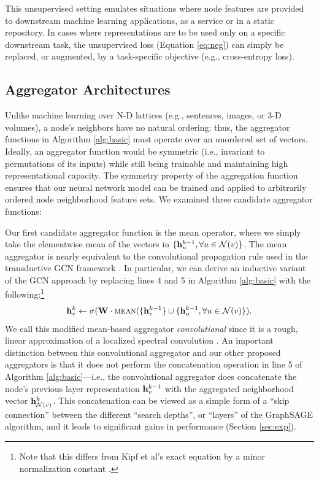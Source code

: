 This unsupervised setting emulates situations where node features are provided to downstream machine learning applications, as a service or in a static repository. 
In cases where representations are to be used only on a specific downstream task, the unsupervised loss (Equation \ref{eq:neg}) can simply be replaced, or augmented, by a task-specific objective (e.g., cross-entropy loss).

\subsection{Aggregator Architectures}\label{sec:aggs}

Unlike machine learning over N-D lattices (e.g., sentences, images, or 3-D volumes), a node's neighbors have no natural ordering; thus, the aggregator functions in Algorithm \ref{alg:basic} must operate over an unordered set of vectors.
Ideally, an aggregator function would be symmetric (i.e., invariant to permutations of its inputs) while still being trainable and maintaining high representational capacity. 
The symmetry property of the aggregation function ensures that our neural network model can be trained and applied to arbitrarily ordered node neighborhood feature sets.
We examined three candidate aggregator functions:

 Our first candidate aggregator function is the mean operator, where we simply take the elementwise mean of the vectors in $\{\mathbf{h}_u^{k-1}, \forall u \in \mathcal{N}(v)\}$.
The mean aggregator is nearly equivalent to the convolutional propagation rule used in the transductive GCN framework \cite{kipf2016semi}.
In particular, we can derive an inductive variant of the GCN approach by replacing lines 4 and 5 in Algorithm \ref{alg:basic} with the following:\footnote{Note that this differs from Kipf et al's exact equation by a minor normalization constant \cite{kipf2016semi}.}
\begin{equation}
\mathbf{h}^k_v \leftarrow \sigma(\mathbf{W}\cdot\textsc{mean}(\{\mathbf{h}^{k-1}_v\} \cup \{\mathbf{h}_u^{k-1}, \forall u \in {\mathcal{N}(v)}\}).
\end{equation}
We call this modified mean-based aggregator {\em convolutional} since it is a rough, linear approximation of a localized spectral convolution \cite{kipf2016semi}.
An important distinction between this convolutional aggregator and our other proposed aggregators is that it does not perform the concatenation operation in line 5 of Algorithm \ref{alg:basic}---i.e., the convolutional aggregator does concatenate the node's previous layer representation $\mathbf{h}^{k-1}_v$ with the aggregated neighborhood vector $\mathbf{h}^{k}_{\mathcal{N}(v)}$. 
This concatenation can be viewed as a simple form of a ``skip connection'' \cite{he2016identity} between the different ``search depths'', or ``layers'' of the GraphSAGE algorithm, and it leads to significant gains in performance (Section \ref{sec:exp}).  

